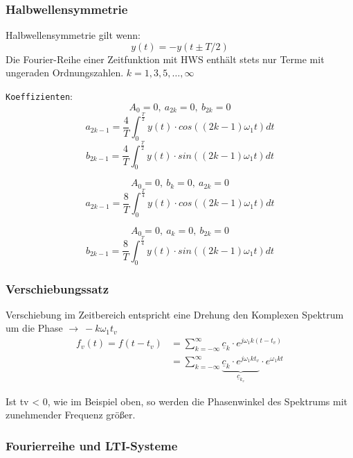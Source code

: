 \subsubsection{Halbwellensymmetrie}
Halbwellensymmetrie gilt wenn:
\[
    y(t) = -y(t \pm T/2)
\]
Die Fourier-Reihe einer Zeitfunktion mit HWS enthält stets
nur Terme mit ungeraden Ordnungszahlen. $k=1,3,5,\dots,\infty$
\begin{mdframed}[style=exercise,frametitle=im Allgemeinen]
    \texttt{\footnotesize Koeffizienten}:\\
    \[
        A_0 = 0,\
        a_{2k} = 0,\
        b_{2k} = 0
    \]
        $$a_{2k-1} = \frac{4}{T}\int^{\frac{T}{2}}_{0}y(t)\cdot cos((2k-1)\omega_1t)dt$$
        $$b_{2k-1} = \frac{4}{T}\int^{\frac{T}{2}}_{0}y(t)\cdot sin((2k-1)\omega_1t)dt$$
\end{mdframed}
\begin{mdframed}[style=exercise,frametitle=gerade Halbwellensymmetrie]
    \[
        A_0 = 0,\
        b_k = 0,\
        a_{2k} = 0
    \]
    $$a_{2k-1} = \frac{8}{T}\int^{\frac{T}{4}}_{0}y(t)\cdot cos((2k-1)\omega_1t)dt$$
\end{mdframed}
\begin{mdframed}[style=exercise,frametitle=ungerade Halbwellensymmetrie]
    \[
        A_0 = 0,\
        a_k = 0,\
        b_{2k} = 0
    \]
    $$b_{2k-1} = \frac{8}{T}\int^{\frac{T}{4}}_{0}y(t)\cdot sin((2k-1)\omega_1t)dt$$
\end{mdframed}

\subsubsection{Verschiebungssatz}
Verschiebung im Zeitbereich entspricht eine Drehung den Komplexen Spektrum um
die Phase $\rightarrow\ -k\omega_1 t_v$
\begin{align*}
    f_v(t) = f(t-t_v) &= \sum_{k=-\infty}^{\infty} \underline{c}_k\cdot e^{j\omega_1 k (t-t_v)} \\
           &= \sum_{k=-\infty}^{\infty} \underbrace{\underline{c}_k\cdot e^{j\omega_1 k t_v}}_{\underline{c}_{k_v}} \cdot e^{\omega_1 k t}
\end{align*}

Ist tv < 0, wie im Beispiel oben, so werden die Phasenwinkel des Spektrums mit
zunehmender Frequenz größer.

\subsubsection{Fourierreihe und LTI-Systeme}

